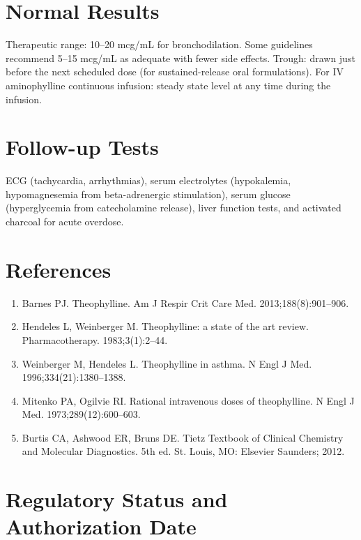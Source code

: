 \section*{Normal Results}
Therapeutic range: 10--20 mcg/mL for bronchodilation. Some guidelines recommend 5--15 mcg/mL as adequate with fewer side effects. Trough: drawn just before the next scheduled dose (for sustained-release oral formulations). For IV aminophylline continuous infusion: steady state level at any time during the infusion.
\section*{Follow-up Tests}
ECG (tachycardia, arrhythmias), serum electrolytes (hypokalemia, hypomagnesemia from beta-adrenergic stimulation), serum glucose (hyperglycemia from catecholamine release), liver function tests, and activated charcoal for acute overdose.
\section*{References}
\begin{enumerate}
  \item Barnes PJ. Theophylline. Am J Respir Crit Care Med. 2013;188(8):901--906.
  \item Hendeles L, Weinberger M. Theophylline: a state of the art review. Pharmacotherapy. 1983;3(1):2--44.
  \item Weinberger M, Hendeles L. Theophylline in asthma. N Engl J Med. 1996;334(21):1380--1388.
  \item Mitenko PA, Ogilvie RI. Rational intravenous doses of theophylline. N Engl J Med. 1973;289(12):600--603.
  \item Burtis CA, Ashwood ER, Bruns DE. Tietz Textbook of Clinical Chemistry and Molecular Diagnostics. 5th ed. St. Louis, MO: Elsevier Saunders; 2012.
\end{enumerate}
\clearpage
\section*{Regulatory Status and Authorization Date}

\clearpage
